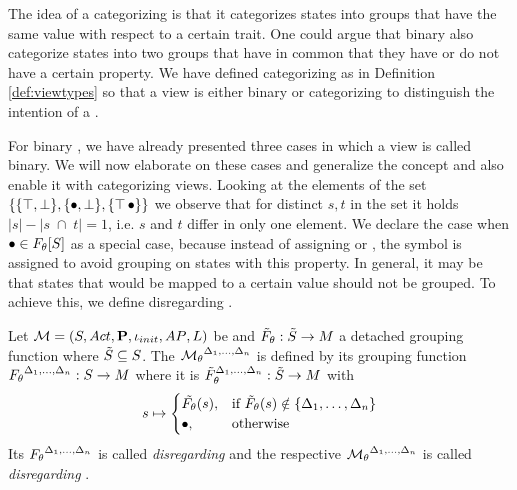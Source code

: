 \documentclass[preview]{standalone}
\begin{document}
The idea of a categorizing \viewN is that it categorizes states into groups that have the same value with respect to a certain trait. One could argue that binary \viewsN also categorize states into two groups that have in common that they have or do not have a certain property. We have defined categorizing \viewsN as in Definition \ref{def:viewtypes} so that a view is either binary or categorizing to distinguish the intention of a \viewN.

For binary \viewsN, we have already presented three cases in which a view is called binary. We will now elaborate on these cases and generalize the concept and also enable it with categorizing views. Looking at the elements of the set $\{\{{\top}, {\bot}\}, \{{\bullet}, {\bot}\}, \{{\top}\, {\bullet}\}\}$ we observe that for distinct $s,t$ in the set it holds $|s|-|s \; \cap \; t| = 1$, i.e. $s$ and $t$ differ in only one element. We declare the case when ${\bullet} \in {\ensuremath{{F_{{\theta}}}}}[{S}]$ as a special case, because instead of assigning \hasppty or \notppty, the symbol \remelem is assigned to avoid grouping on states with this property. In general, it may be that states that would be mapped to a certain value should not be grouped. To achieve this, we define disregarding \viewsN.

\begin{definition}
	Let ${{{\mathcal{M}}}} = {{({S}, {Act}, {\textbf{P}}, {\iota_{init}}, {AP}, {L})}}$ be \achgphN and ${\tilde{F}_{{\theta}}} : {\tilde{{S}}} \to {\ensuremath{{M}}}$ a detached grouping function where ${\tilde{{S}}} \subseteq {S}$. The \viewN ${{{{\mathcal{M}}}}_{{\theta}}}^{{{\Delta}_1, \dots, {\Delta}_n}}$ is defined by its grouping function ${F_{{\theta}}}^{{{\Delta}_1, \dots, {\Delta}_n}} : {S} \to {\ensuremath{{M}}}$ where it is ${\tilde{F}_{{\theta}}}^{{{\Delta}_1, \dots, {\Delta}_n}} : {\tilde{{S}}} \to {\ensuremath{{M}}}$ with
	\[
	\state \mapsto
	\begin{cases}
		\tilde\grpfct(\state),				& \text{if } \grpfctsub(\state) \notin \{\disregardelements\} \\ 		\remelem,          	& \text{otherwise}
	\end{cases}
	\]
	Its \grpfctN ${F_{{\theta}}}^{{{\Delta}_1, \dots, {\Delta}_n}}$ is called \grpfct \emph{disregarding} \disregardelements and the respective \viewN ${{{{\mathcal{M}}}}_{{\theta}}}^{{{\Delta}_1, \dots, {\Delta}_n}}$ is called \view \emph{disregarding} \disregardelements. 
\end{definition}
\end{document}
